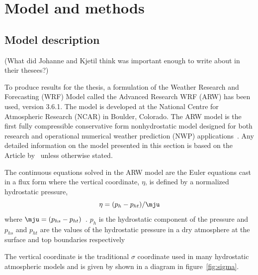 \chapter{Model and methods}
\label{chap:modmet}
\section{Model description}
\label{sec:modeldes}
(What did Johanne and Kjetil think was important enough to write about in their thesees?)

To produce results for the thesis, a formulation of the Weather Research and Forecasting (WRF) Model called the Advanced Research WRF (ARW) has been used, version 3.6.1. The model is developed at the National Centre for Atmospheric Research (NCAR) in Boulder, Colorado. The ARW model is the first fully compressible conservative form nonhydrostatic model designed for both research and operational numerical weather prediction (NWP) applications~\citep{Skamarock2008}. Any detailed information on the model presented in this section is based on the Article by~\cite{Skamarock2008} unless otherwise stated.

The continuous equations solved in the ARW model are the Euler equations cast in a flux form where the vertical coordinate, $\eta$, is defined by a normalized hydrostatic pressure,
\begin{equation}
\eta = (p_h - p_{ht})/\mju 
\end{equation}
where $\mju = (p_{hs} - p_{ht})$~\citep{Skamarock2008}. $p_h$ is the hydrostatic component of the pressure and $p_{hs}$ and $p_{ht}$ are the values of the hydrostatic pressure in a dry atmosphere at the surface and top boundaries respectively%

The vertical coordinate is the traditional $\sigma$ coordinate used in many hydrostatic atmospheric models and is given by shown in a diagram in figure~\ref{fig:sigma}.



